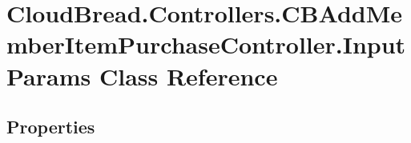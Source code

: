\hypertarget{class_cloud_bread_1_1_controllers_1_1_c_b_add_member_item_purchase_controller_1_1_input_params}{}\section{Cloud\+Bread.\+Controllers.\+C\+B\+Add\+Member\+Item\+Purchase\+Controller.\+Input\+Params Class Reference}
\label{class_cloud_bread_1_1_controllers_1_1_c_b_add_member_item_purchase_controller_1_1_input_params}
\subsection*{Properties}

